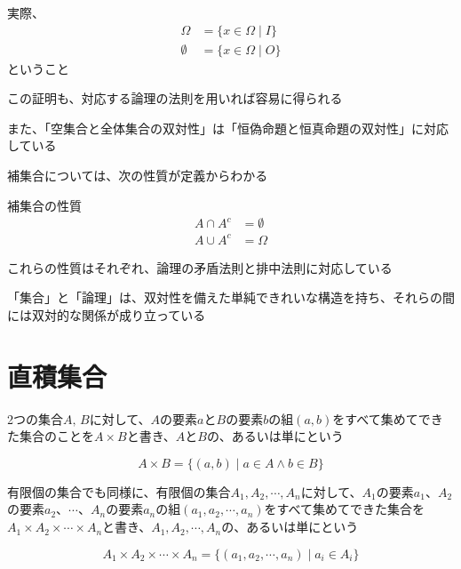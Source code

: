 \documentclass[b5paper,12pt]{jsarticle}
\begin{document}
実際、
\begin{align*}
  \Omega    & = \{x \in \Omega \mid I\} \\
  \emptyset & = \{x \in \Omega \mid O\}
\end{align*}
ということ

この証明も、対応する論理の法則を用いれば容易に得られる

\br

また、「空集合と全体集合の双対性」は「恒偽命題と恒真命題の双対性」に対応している

\sectionline

補集合については、次の性質が定義からわかる

\begin{theorem}{補集合の性質}
  \begin{align*}
    A \cap A^c & = \emptyset \\
    A \cup A^c & = \Omega
  \end{align*}
\end{theorem}

これらの性質はそれぞれ、論理の矛盾法則と排中法則に対応している

\sectionline

「集合」と「論理」は、双対性を備えた単純できれいな構造を持ち、それらの間には双対的な関係が成り立っている

\sectionline
\section{直積集合}

2つの集合$A, \, B$に対して、$A$の要素$a$と$B$の要素$b$の組$(a, b)$をすべて集めてできた集合のことを$A \times B$と書き、$A$と$B$の、あるいは単にという

\begin{equation*}
  A \times B = \{(a, b) \mid a \in A \land b \in B\}
\end{equation*}

有限個の集合でも同様に、有限個の集合$A_1, A_2, \cdots , A_n$に対して、$A_1$の要素$a_1$、$A_2$の要素$a_2$、$\cdots$、$A_n$の要素$a_n$の組$(a_1, a_2, \cdots , a_n)$をすべて集めてできた集合を$A_1 \times A_2 \times \cdots \times A_n$と書き、$A_1, A_2, \cdots , A_n$の、あるいは単にという

\begin{equation*}
  A_1 \times A_2 \times \cdots \times A_n = \{(a_1, a_2, \cdots , a_n) \mid a_i \in A_i\}
\end{equation*}
\end{document}
